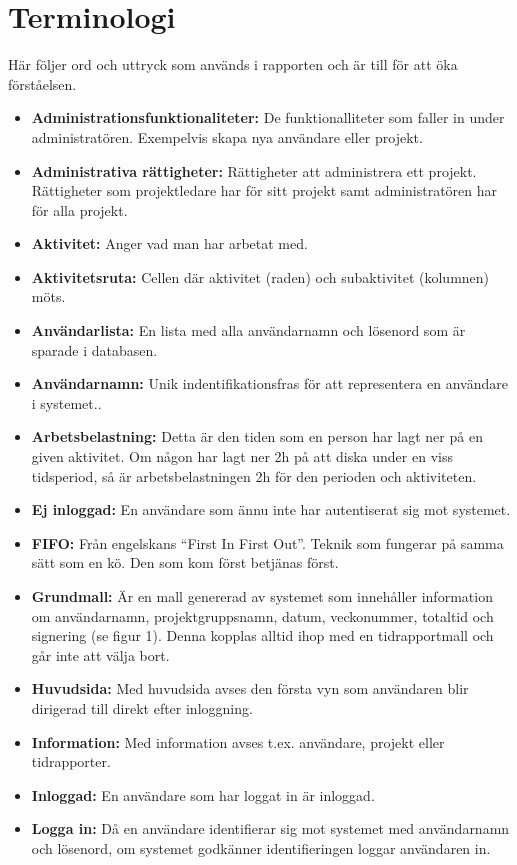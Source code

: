 \documentclass[a4paper]{article}
\begin{document}
\section{Terminologi}
\label{terminologi}
Här följer ord och uttryck som används i rapporten och är till för att öka förståelsen.
\begin{itemize}
\item [] \textbf{Administrationsfunktionaliteter:} De funktionalliteter som faller in under administratören. Exempelvis skapa nya användare eller projekt.
\item [] \textbf{Administrativa rättigheter:} Rättigheter att administrera ett projekt. Rättigheter som projektledare har för sitt projekt samt administratören har för alla projekt.
\item [] \textbf{Aktivitet:} Anger vad man har arbetat med.
\item [] \textbf{Aktivitetsruta:} Cellen där aktivitet (raden) och subaktivitet (kolumnen) möts.
\item [] \textbf{Användarlista:} En lista med alla användarnamn och lösenord som är sparade i databasen.
\item [] \textbf{Användarnamn:} Unik indentifikationsfras för att representera en användare i systemet..
\item [] \textbf{Arbetsbelastning:} Detta är den tiden som en person har lagt ner på en given aktivitet. Om någon har lagt ner 2h på att diska under en viss tidsperiod, så är arbetsbelastningen 2h för den perioden och aktiviteten.
\item [] \textbf{Ej inloggad:} En användare som ännu inte har autentiserat sig mot systemet.
\item [] \textbf{FIFO:} Från engelskans ``First In First Out''. Teknik som fungerar på samma sätt som en kö. Den som kom först betjänas först.
\item [] \textbf{Grundmall:} Är en mall genererad av systemet som innehåller information om användarnamn, projektgruppsnamn, datum, veckonummer, totaltid och signering (se figur 1). Denna kopplas alltid ihop med en tidrapportmall och går inte att välja bort.
\item [] \textbf{Huvudsida:} Med huvudsida avses den första vyn som användaren blir dirigerad till direkt efter inloggning. 
\item [] \textbf{Information:} Med information avses t.ex. användare, projekt eller tidrapporter.
\item [] \textbf{Inloggad:} En användare som har loggat in är inloggad.
\item [] \textbf{Logga in:} Då en användare identifierar sig mot systemet med användarnamn och lösenord, om systemet godkänner identifieringen loggar användaren in.

\end{itemize}
\end{document}
